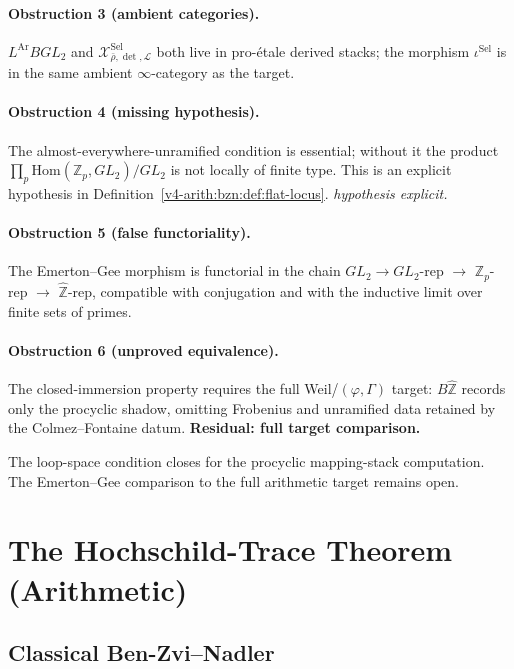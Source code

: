 \paragraph{Obstruction 3 (ambient categories).} \(L^{\mathrm{Ar}}BGL_{2}\)
and \(\mathcal{X}^{\mathrm{Sel}}_{\bar\rho,\det,\mathcal{L}}\) both live in
pro-\'etale derived stacks; the morphism \(\iota^{\mathrm{Sel}}\)
is in the same ambient \(\infty\)-category as the target.

\paragraph{Obstruction 4 (missing hypothesis).} The
almost-everywhere-unramified condition is essential; without it
the product \(\prod_{p}\mathrm{Hom}(\mathbb{Z}_{p},GL_{2})/GL_{2}\)
is not locally of finite type. This is an explicit hypothesis in
Definition~\ref{v4-arith:bzn:def:flat-locus}. \emph{hypothesis
explicit.}

\paragraph{Obstruction 5 (false functoriality).} The Emerton--Gee
morphism is functorial in the chain \(GL_{2}\to GL_{2}\)-rep
\(\to\) \(\mathbb{Z}_{p}\)-rep \(\to\) \(\widehat{\mathbb{Z}}\)-rep,
compatible with conjugation and with the inductive limit over
finite sets of primes.

\paragraph{Obstruction 6 (unproved equivalence).} The closed-immersion
property requires the full Weil/\((\varphi,\Gamma)\) target:
\(B\widehat{\mathbb{Z}}\) records only the procyclic shadow, omitting
Frobenius and unramified data retained by the Colmez--Fontaine datum.
\textbf{Residual: full target comparison.}


The loop-space condition closes for the procyclic mapping-stack
computation. The Emerton--Gee comparison to the full arithmetic target
remains open.

\section{The Hochschild-Trace Theorem (Arithmetic)}
\label{v4-arith:bzn:HH-arith}

\subsection{Classical Ben-Zvi--Nadler}

